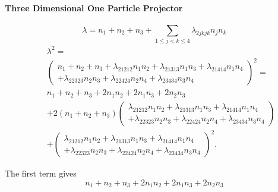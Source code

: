 \documentclass[12pt]{article}
\begin{document}
\paragraph{Three Dimensional One Particle Projector}

\begin{equation*}
\lambda =n_{1}+n_{2}+n_{3}+\sum_{1\leq j<k\leq 4}\lambda _{2jkjk}n_{j}n_{k}
\end{equation*}%
\begin{eqnarray*}
&&\lambda ^{2}= \\
&&\left( 
\begin{array}{c}
n_{1}+n_{2}+n_{3}+\lambda _{21212}n_{1}n_{2}+\lambda
_{21313}n_{1}n_{3}+\lambda _{21414}n_{1}n_{4} \\ 
+\lambda _{22323}n_{2}n_{3}+\lambda _{22424}n_{2}n_{4}+\lambda
_{23434}n_{3}n_{4}%
\end{array}%
\right) ^{2}= \\
&&n_{1}+n_{2}+n_{3}+2n_{1}n_{2}+2n_{1}n_{3}+2n_{2}n_{3} \\
&&+2\left( n_{1}+n_{2}+n_{3}\right) \left( 
\begin{array}{c}
\lambda _{21212}n_{1}n_{2}+\lambda _{21313}n_{1}n_{3}+\lambda
_{21414}n_{1}n_{4} \\ 
+\lambda _{22323}n_{2}n_{3}+\lambda _{22424}n_{2}n_{4}+\lambda
_{23434}n_{3}n_{4}%
\end{array}%
\right) \\
&&+\left( 
\begin{array}{c}
\lambda _{21212}n_{1}n_{2}+\lambda _{21313}n_{1}n_{3}+\lambda
_{21414}n_{1}n_{4} \\ 
+\lambda _{22323}n_{2}n_{3}+\lambda _{22424}n_{2}n_{4}+\lambda
_{23434}n_{3}n_{4}%
\end{array}%
\right) ^{2}.
\end{eqnarray*}

The first term gives%
\begin{equation}
n_{1}+n_{2}+n_{3}+2n_{1}n_{2}+2n_{1}n_{3}+2n_{2}n_{3}
\end{equation}
\end{document}
